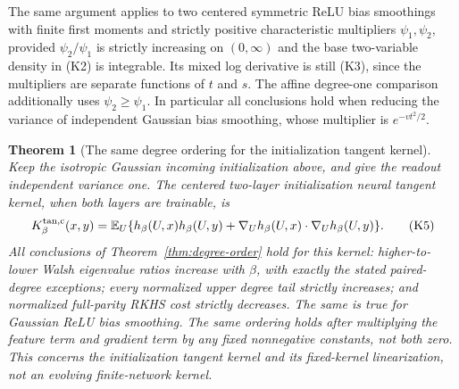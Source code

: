 \documentclass[11pt]{article}
\newtheorem{theorem}{Theorem}\newtheorem{lemma}[theorem]{Lemma}
\newcommand{\E}{\mathbb E}\newcommand{\R}{\mathbb R}
\begin{document}
The same argument applies to two centered symmetric ReLU bias smoothings
with finite first moments and strictly positive characteristic multipliers $\psi_1,\psi_2$,
provided $\psi_2/\psi_1$ is strictly increasing on $(0,\infty)$ and
the base two-variable density in (K2) is integrable. Its mixed log
derivative is still (K3), since the multipliers are separate functions
of $t$ and $s$. The affine degree-one comparison additionally uses
$\psi_2\ge\psi_1$. In particular all conclusions hold when reducing
the variance of independent Gaussian bias smoothing, whose multiplier
is $e^{-vt^2/2}$.


\begin{theorem}[The same degree ordering for the initialization tangent kernel]
\label{thm:tangent-order}
Keep the isotropic Gaussian incoming initialization above, and give the
readout independent variance one. The centered two-layer initialization
neural tangent kernel, when both layers are trainable, is
\[
 K_\beta^{\rm tan,c}(x,y)
 =\E_U\{h_\beta(U,x)h_\beta(U,y)
            +\nabla_Uh_\beta(U,x)\cdot\nabla_Uh_\beta(U,y)\}.
                                                               \tag{K5}
\]
All conclusions of Theorem~\ref{thm:degree-order} hold for this kernel:
higher-to-lower Walsh eigenvalue ratios increase with $\beta$, with
exactly the stated paired-degree exceptions; every normalized upper
degree tail strictly increases; and normalized full-parity RKHS cost
strictly decreases. The same is true for Gaussian ReLU bias smoothing.
The same ordering holds after multiplying the feature term and gradient
term by any fixed nonnegative constants, not both zero.
This concerns the initialization tangent kernel and its fixed-kernel
linearization, not an evolving finite-network kernel.
\end{theorem}
\end{document}
